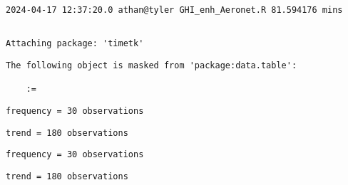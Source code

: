 \documentclass[
  10pt,
  a4paper,oneside]{article}
\begin{document}
\begin{verbatim}
2024-04-17 12:37:20.0 athan@tyler GHI_enh_Aeronet.R 81.594176 mins
\end{verbatim}

\begin{verbatim}

Attaching package: 'timetk'
\end{verbatim}

\begin{verbatim}
The following object is masked from 'package:data.table':

    :=
\end{verbatim}

\begin{verbatim}
frequency = 30 observations
\end{verbatim}

\begin{verbatim}
trend = 180 observations
\end{verbatim}

\begin{verbatim}
frequency = 30 observations
\end{verbatim}

\begin{verbatim}
trend = 180 observations
\end{verbatim}
\end{document}
